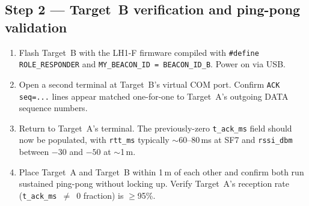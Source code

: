 \documentclass[11pt,letterpaper]{article}
\begin{document}
\subsection{Step 2 --- Target~B verification and ping-pong validation}
\begin{enumerate}[leftmargin=2em]
	\item Flash Target~B with the LH1-F firmware compiled with \texttt{\#define ROLE\_RESPONDER} and \texttt{MY\_BEACON\_ID = BEACON\_ID\_B}. Power on via USB.
	\item Open a second terminal at Target~B's virtual COM port. Confirm \texttt{ACK seq=...} lines appear matched one-for-one to Target~A's outgoing DATA sequence numbers.
	\item Return to Target~A's terminal. The previously-zero \texttt{t\_ack\_ms} field should now be populated, with \texttt{rtt\_ms} typically $\sim$60--80\,ms at SF7 and \texttt{rssi\_dbm} between $-30$ and $-50$ at $\sim$1\,m.
	\item Place Target~A and Target~B within 1\,m of each other and confirm both run sustained ping-pong without locking up. Verify Target~A's reception rate (\texttt{t\_ack\_ms}~$\ne$~0 fraction) is $\geq$95\%.
\end{enumerate}
\end{document}
